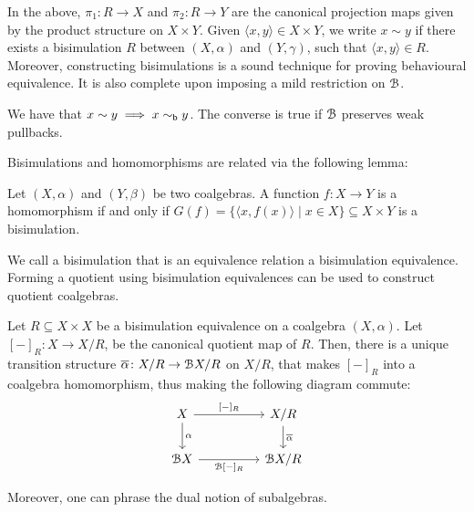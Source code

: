 In the above, $\pi_1 \colon R \to X$ and $\pi_2 \colon R \to Y$ are the canonical projection maps given by the product structure on $X\times Y$. Given $\langle x,y \rangle \in X \times Y$, we write $x \sim y$ if there exists a bisimulation $R$ between $(X, \alpha)$ and $(Y, \gamma)$, such that $\langle x,y \rangle \in R$. Moreover, constructing bisimulations is a sound technique for proving behavioural equivalence. It is also complete upon imposing a mild restriction on $\mathcal{B}$.
\begin{lemma}\label{c2:lem:behavioural_equivalence}
We have that
$
x \sim y \implies x \sim_{\mathsf{b}} y
$. The converse is true if $\mathcal{B}$ preserves weak pullbacks.	
\end{lemma}
Bisimulations and homomorphisms are related via the following lemma:
\begin{lemma}\label{c2:lem:functional_bisimulation}
	Let $(X, \alpha)$ and $(Y, \beta)$ be two coalgebras. A function $f \colon X \to Y$ is a homomorphism if and only if $G(f) = \{\langle x, f(x) \rangle \mid x \in X\} \subseteq X \times Y$ is a bisimulation.
\end{lemma}
We call a bisimulation that is an equivalence relation a bisimulation equivalence. Forming a quotient using bisimulation equivalences can be used to construct quotient coalgebras.
\begin{lemma}\label{c2:lem:quotient_coalgebra}
	Let $R \subseteq {X \times X}$ be a bisimulation equivalence on a coalgebra $(X, \alpha)$. Let $[-]_{R} \colon X \to {X}/{R}$, be the canonical quotient map of $R$. Then, there is a unique transition structure $\overline{\alpha} \colon {X}/{R} \to \mathcal{B} {X}/{R}$ on ${X}/{R}$, that makes $[-]_R$ into a coalgebra homomorphism, thus making the following diagram commute:
\[\begin{tikzcd}
	X && {{X}/{R}} \\
	{\funB X} && {\funB {X}/{R}}
	\arrow["{[-]_R}", from=1-1, to=1-3]
	\arrow["\alpha", from=1-1, to=2-1]
	\arrow["{\overline\alpha}", from=1-3, to=2-3]
	\arrow["{\funB [-]_R}"', from=2-1, to=2-3]
\end{tikzcd}\]
\end{lemma}
Moreover, one can phrase the dual notion of subalgebras.
